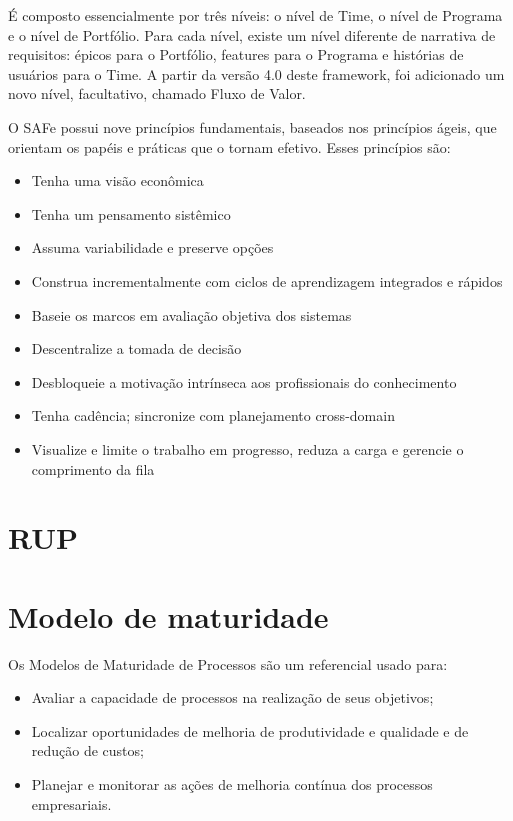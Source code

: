 É composto essencialmente por três níveis: o nível de Time, o nível de Programa e o nível de Portfólio. Para cada nível, existe um nível diferente de narrativa de requisitos: épicos para o Portfólio, features para o Programa e histórias de usuários para o Time. A partir da versão 4.0 deste framework, foi adicionado um novo nível, facultativo, chamado Fluxo de Valor.

O SAFe possui nove princípios fundamentais, baseados nos princípios ágeis, que orientam os papéis e práticas que o tornam efetivo. Esses princípios são:
\begin{itemize}
\item Tenha uma visão econômica
\item Tenha um pensamento sistêmico
\item Assuma variabilidade e preserve opções
\item Construa incrementalmente com ciclos de aprendizagem integrados e rápidos
\item Baseie os marcos em avaliação objetiva dos sistemas 	
\item Descentralize a tomada de decisão
\item Desbloqueie a motivação intrínseca aos profissionais do conhecimento
\item Tenha cadência; sincronize com planejamento cross-domain
\item Visualize e limite o trabalho em progresso, reduza a carga e gerencie o comprimento da fila
\end{itemize}

  \section{RUP}
  \section{Modelo de maturidade}	
Os Modelos de Maturidade de Processos são um referencial usado para:
\begin{itemize}
\item Avaliar a capacidade de processos na realização de seus objetivos;
\item Localizar oportunidades de melhoria de produtividade e qualidade e de redução de custos;
\item Planejar e monitorar as ações de melhoria contínua dos processos empresariais.
\end{itemize}

